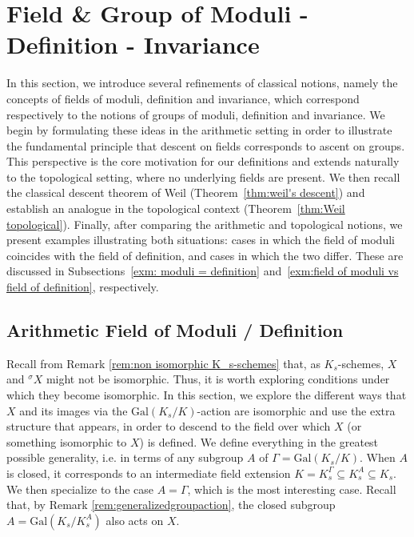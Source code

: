 \documentclass[10pt]{amsart}
\theoremstyle{definition}
\newcommand{\Gal}{{ \mathrm{Gal}}}
\begin{document}
\section{Field \& Group of Moduli - Definition - Invariance}\label{sec:field of moduli, definition, invariance}
In this section, we introduce several refinements of classical notions, namely the concepts of fields of moduli, definition and invariance, which correspond respectively to the notions of groups of moduli, definition and invariance. We begin by formulating these ideas in the arithmetic setting in order to illustrate the fundamental principle that descent on fields corresponds to ascent on groups. This perspective is the core motivation for our definitions and extends naturally to the topological setting, where no underlying fields are present. We then recall the classical descent theorem of Weil (Theorem~\ref{thm:weil's descent}) and establish an analogue in the topological context (Theorem~\ref{thm:Weil topological}). Finally, after comparing the arithmetic and topological notions, we present examples illustrating both situations: cases in which the field of moduli coincides with the field of definition, and cases in which the two differ. These are discussed in Subsections~\ref{exm: moduli = definition} and~\ref{exm:field of moduli vs field of definition}, respectively.

\subsection{Arithmetic Field of Moduli / Definition} \label{sec:FieldMODDefinition}

Recall from Remark \ref{rem:non isomorphic K_s-schemes} that, as $K_s$-schemes, $X$ and $^\sigma \! X$ might not be isomorphic. Thus, it is worth exploring conditions under which they become isomorphic. In this section, we explore the different ways that $X$ and its images via the $\Gal(K_s /K)$-action are isomorphic and use the extra structure that appears, in order to descend to the field over which $X$ (or something isomorphic to $X$) is defined. We define everything in the greatest possible generality, i.e. in terms of any subgroup $A$ of $\mathfrak{\Gamma} = \Gal(K_s/K)$. When $A$ is closed, it corresponds to an intermediate field extension
$K= K_s^{\mathfrak{\Gamma}} \subseteq K_s^A \subseteq K_s$. We then specialize to the case $A=\mathfrak{\Gamma}$, which is the most interesting case. Recall that, by Remark \ref{rem:generalizedgroupaction}, the closed subgroup $A = \Gal(K_s / K_s^A)$ also acts on $X$.
\end{document}
